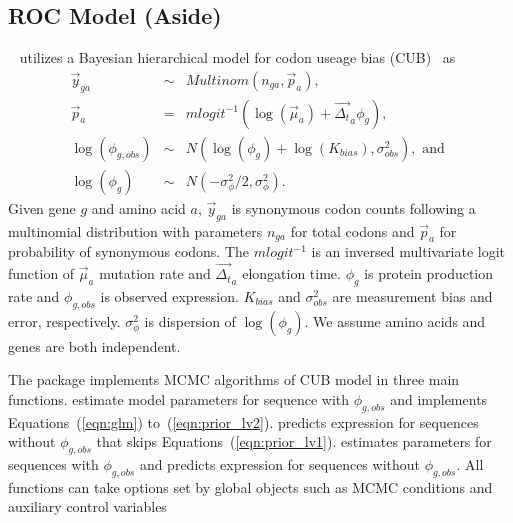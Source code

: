 \subsection[ROC Model (Aside)]{ROC Model (Aside)}
\label{sec:roc_model}

~\citep{Chen2014cubfitspackage} utilizes a
Bayesian hierarchical model for codon useage bias
(CUB)~\citep{Gilchrist2007,Shah2011,Wallace2013} as
\begin{eqnarray}
\vec{y}_{ga} &
    \sim & Multinom(n_{ga}, \vec{p}_{a}),
    \label{eqn:glm} \\
\vec{p}_{a} & = &
    mlogit^{-1}(\log(\vec{\mu}_{a}) + \vec{\Delta_t}_{a} \phi_g),
    \label{eqn:link_fcn} \\
\log(\phi_{g, obs}) & \sim &
    N(\log(\phi_g) + \log(K_{bias}), \sigma^2_{obs}),  \mbox{ and }
    \label{eqn:prior_lv1} \\
\log(\phi_g) & \sim &
    N(-\sigma^2_{\phi}/2, \sigma^2_{\phi}).
    \label{eqn:prior_lv2}
\end{eqnarray}
Given gene $g$ and amino acid $a$,
$\vec{y}_{ga}$ is synonymous codon counts
following a multinomial distribution with parameters
$n_{ga}$ for total codons and $\vec{p}_{a}$ for probability of
synonymous codons.
The $mlogit^{-1}$ is an inversed multivariate logit
function of $\vec{\mu}_{a}$ mutation rate and $\vec{\Delta_t}_{a}$
elongation time. $\phi_g$ is protein production rate 
and $\phi_{g,obs}$ is observed expression.
$K_{bias}$ and $\sigma^2_{obs}$ are measurement bias and
error, respectively. $\sigma^2_{\phi}$ is dispersion of $\log(\phi_g)$.
We assume amino acids and genes are both independent.

The package implements MCMC algorithms of CUB model in three main functions.
 estimate model parameters for sequence with $\phi_{g,obs}$
and implements Equations~(\ref{eqn:glm}) to~(\ref{eqn:prior_lv2}).
 predicts expression for sequences without $\phi_{g,obs}$
that skips Equations~(\ref{eqn:prior_lv1}).
 estimates parameters for sequences with $\phi_{g,obs}$
and predicts expression for sequences without $\phi_{g,obs}$.
All functions can take options set by global objects such as
MCMC conditions and auxiliary control variables


